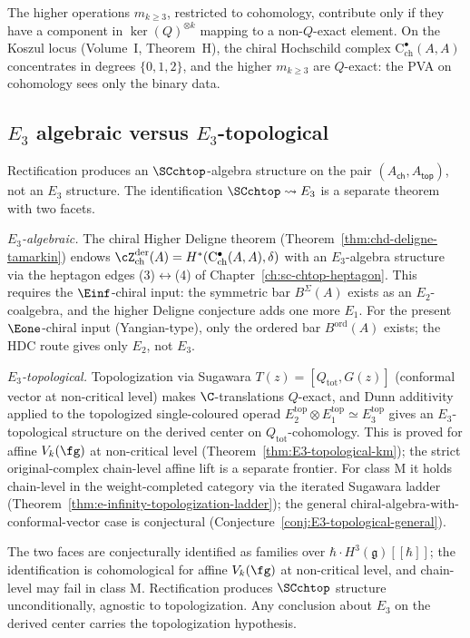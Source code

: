 The higher operations $m_{k \geq 3}$, restricted to cohomology,
contribute only if they have a component in $\ker(Q)^{\otimes k}$
mapping to a non-$Q$-exact element. On the Koszul locus
(Volume~I, Theorem~H), the chiral Hochschild complex
$\mathrm{C}^\bullet_{\mathrm{ch}}(A, A)$ concentrates in degrees
$\{0, 1, 2\}$, and the higher $m_{k \geq 3}$ are $Q$-exact: the PVA
on cohomology sees only the binary data.

\subsection{$E_3$ algebraic versus $E_3$-topological}
\label{subsec:e3-algebraic-vs-topological}

Rectification produces an $\SCchtop$-algebra structure on the pair
$(A_{\mathsf{ch}}, A_{\mathsf{top}})$, not an $E_3$ structure. The
identification $\SCchtop \rightsquigarrow E_3$ is a separate theorem
with two facets.

\emph{$E_3$-algebraic.} The chiral Higher Deligne theorem
(Theorem~\ref{thm:chd-deligne-tamarkin}) endows
$\cZ^{\mathrm{der}}_{\mathrm{ch}}(A) =
H^*(\mathrm{C}^\bullet_{\mathrm{ch}}(A, A), \delta)$ with an
$E_3$-algebra structure via the heptagon edges
(3)$\leftrightarrow$(4) of Chapter~\ref{ch:sc-chtop-heptagon}. This
requires the $\Einf$-chiral input: the symmetric bar $B^\Sigma(A)$
exists as an $E_2$-coalgebra, and the higher Deligne conjecture
adds one more $E_1$. For the present $\Eone$-chiral input
(Yangian-type), only the ordered bar $B^{\mathrm{ord}}(A)$ exists;
the HDC route gives only $E_2$, not $E_3$.

\emph{$E_3$-topological.} Topologization via Sugawara
$T(z) = [Q_{\mathrm{tot}}, G(z)]$ (conformal vector at non-critical
level) makes $\C$-translations $Q$-exact, and Dunn additivity
applied to the topologized single-coloured operad
$E_2^{\mathrm{top}} \otimes E_1^{\mathrm{top}} \simeq
E_3^{\mathrm{top}}$ gives an $E_3$-topological structure on the
derived center on \(Q_{\mathrm{tot}}\)-cohomology. This is proved for
affine $V_k(\fg)$ at non-critical level
(Theorem~\ref{thm:E3-topological-km}); the strict original-complex
chain-level affine lift is a separate frontier. For class M it holds
chain-level in the weight-completed category via the
iterated Sugawara ladder
(Theorem~\ref{thm:e-infinity-topologization-ladder});
the general chiral-algebra-with-conformal-vector case is
conjectural (Conjecture~\ref{conj:E3-topological-general}).

The two faces are conjecturally identified as families over
$\hbar \cdot H^3(\mathfrak{g})[[\hbar]]$; the identification is
cohomological for affine $V_k(\fg)$ at non-critical level, and
chain-level may fail in class M. Rectification produces $\SCchtop$
structure unconditionally, agnostic to topologization. Any
conclusion about $E_3$ on the derived center carries the
topologization hypothesis.

